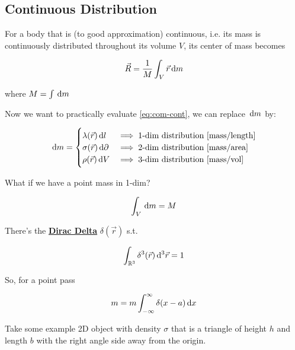 \subsection{Continuous Distribution}

For a body that is (to good approximation) continuous, i.e. its mass is continuously distributed throughout its volume $V$, its center of mass becomes

\begin{equation}\label{eq:com-cont}
	\vec R = \frac{1}{M} \int_V \vec r \D m
\end{equation}

where $M = \int \D m$

Now we want to practically evaluate \cref*{eq:com-cont}, we can replace $\D m$ by:

\begin{equation}
	\D m = \begin{cases}
		\lambda(\vec r) \D l &\implies \text{1-dim distribution [mass/length]}\\
		\sigma(\vec r) \D \partial &\implies \text{2-dim distribution [mass/area]}\\
		\rho(\vec r) \D V &\implies \text{3-dim distribution [mass/vol]}
	\end{cases}
\end{equation}

\begin{remark}
	What if we have a point mass in 1-dim?

	\begin{equation}
		\int_V \D m = M
	\end{equation}

	There's the \href{https://en.wikipedia.org/wiki/Dirac_delta_function}{\textbf{Dirac Delta}} $\delta (\vec r)$ s.t.

	\begin{equation}
		\int_{\mathbb{R}^3} \delta^3(\vec r) \D^3 \vec r = 1
	\end{equation}

	So, for a point pass

	\begin{equation}
		m = m \int_{-\infty}^\infty \delta (x-a) \D x
	\end{equation}
\end{remark}

\begin{example}
	Take some example 2D object with density $\sigma$ that is a triangle of height $h$ and length $b$ with the right angle side away from the origin.
\end{example}

